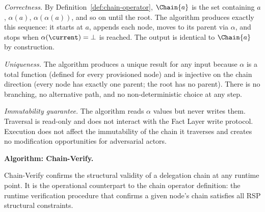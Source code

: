 \textit{Correctness.} By Definition~\ref{def:chain-operator}, $\Chain{a}$ is the set containing $a$, $\alpha(a)$, $\alpha(\alpha(a))$, and so on until the root. The algorithm produces exactly this sequence: it starts at $a$, appends each node, moves to its parent via $\alpha$, and stops when $\alpha(\current) = \bot$ is reached. The output is identical to $\Chain{a}$ by construction.

\textit{Uniqueness.} The algorithm produces a unique result for any input because $\alpha$ is a total function (defined for every provisioned node) and is injective on the chain direction (every node has exactly one parent; the root has no parent). There is no branching, no alternative path, and no non-deterministic choice at any step.

\textit{Immutability guarantee.} The algorithm reads $\alpha$ values but never writes them. Traversal is read-only and does not interact with the Fact Layer write protocol. Execution does not affect the immutability of the chain it traverses and creates no modification opportunities for adversarial actors.

\bigskip
\noindent\textbf{Algorithm: Chain-Verify.}

Chain-Verify confirms the structural validity of a delegation chain at any runtime point. It is the operational counterpart to the chain operator definition: the runtime verification procedure that confirms a given node's chain satisfies all RSP structural constraints.

